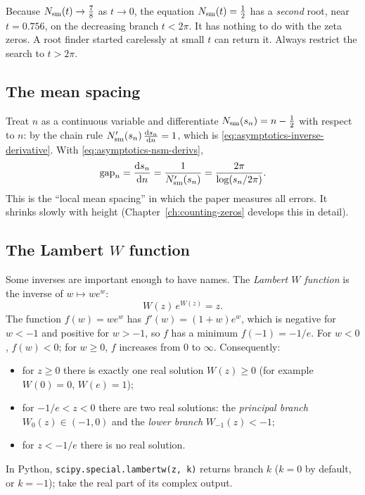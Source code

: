 \begin{pitfall}
Because $N_{\mathrm{sm}}(t)\to\tfrac78$ as $t\to0$, the equation $N_{\mathrm{sm}}(t)=\tfrac12$ has a \emph{second} root, near $t=0.756$, on the decreasing branch $t<2\pi$. It has nothing to do with the zeta zeros. A root finder started carelessly at small $t$ can return it. Always restrict the search to $t>2\pi$.
\end{pitfall}

\subsection{The mean spacing}

Treat $n$ as a continuous variable and differentiate $N_{\mathrm{sm}}(s_n)=n-\tfrac12$ with respect to $n$: by the chain rule $N_{\mathrm{sm}}'(s_n)\,\frac{\mathrm{d} s_n}{\mathrm{d} n}=1$, which is \cref{eq:asymptotics-inverse-derivative}. With \cref{eq:asymptotics-nsm-derivs},
\begin{equation}
\mathrm{gap}_n=\frac{\mathrm{d} s_n}{\mathrm{d} n}=\frac{1}{N_{\mathrm{sm}}'(s_n)}=\frac{2\pi}{\log(s_n/2\pi)}.
\label{eq:asymptotics-gap}
\end{equation}
This is the ``local mean spacing'' in which the paper measures all errors. It shrinks slowly with height (Chapter~\ref{ch:counting-zeros} develops this in detail).

\subsection{The Lambert $W$ function}

Some inverses are important enough to have names. The \emph{Lambert $W$ function} is the inverse of $w\mapsto we^{w}$:
\begin{equation}
W(z)\,e^{W(z)}=z .
\label{eq:asymptotics-lambertw}
\end{equation}
The function $f(w)=we^w$ has $f'(w)=(1+w)e^w$, which is negative for $w<-1$ and positive for $w>-1$, so $f$ has a minimum $f(-1)=-1/e$. For $w<0$, $f(w)<0$; for $w\ge0$, $f$ increases from $0$ to $\infty$. Consequently:
\begin{itemize}
\item for $z\ge0$ there is exactly one real solution $W(z)\ge0$ (for example $W(0)=0$, $W(e)=1$);
\item for $-1/e<z<0$ there are two real solutions: the \emph{principal branch} $W_0(z)\in(-1,0)$ and the \emph{lower branch} $W_{-1}(z)<-1$;
\item for $z<-1/e$ there is no real solution.
\end{itemize}
In Python, \texttt{scipy.special.lambertw(z, k)} returns branch $k$ ($k=0$ by default, or $k=-1$); take the real part of its complex output.

